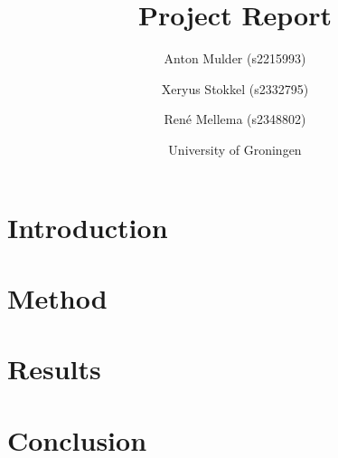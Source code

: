 \documentclass{article}
\title{\textbf{\huge Project Report}}
\author{Anton Mulder (s2215993) \and Xeryus Stokkel (s2332795)  \and Ren\'e Mellema (s2348802)}
\date{University of Groningen}
\begin{document}
\maketitle
\begin{abstract}

\end{abstract}

\section{Introduction}


\section{Method}


\section{Results}


\section{Conclusion}





\end{document}
